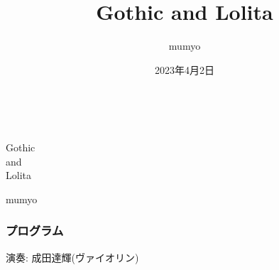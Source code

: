 \documentclass[a6paper, 9pt, openright, titlepage, twoside]{ltjsarticle}
\title{ Gothic and Lolita }
\author{mumyo}
\date{2023年4月2日}
\begin{document}

\newpage
\thispagestyle{empty}

\begin{center}
{\HUGE  \hspace{2\zw}  \ttfamily Gothic \\ and  \vspace{1\zw} \\ Lolita}


 {\Huge \hspace{2\zw}  \ttfamily mumyo }


\end{center}


\newpage



\thispagestyle{empty}


\vspace*{-16mm} %
\subsubsection*{プログラム}
演奏: 成田達輝(ヴァイオリン)%
\end{document}
